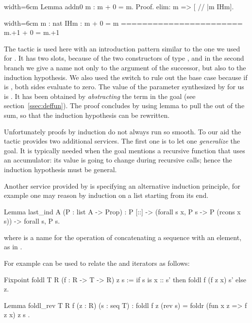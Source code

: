 \begin{coq}{}{width=6cm}
Lemma addn0 m : m + 0 = m.
Proof.
elim: m => [ // |m IHm].
\end{coq}
\begin{coqout}{}{width=6cm}
m : nat
IHm : m + 0 = m
=======================
m.+1 + 0 = m.+1
\end{coqout}
The  tactic is used here with an introduction pattern similar
to the one we used for . It has two slots, because of the
two constructors of type , and in the second branch we give a
name not only to the argument  of the successor, but also to the
induction hypothesis. We also used the \C{//} switch to rule out the
base case because if
 is , both sides evaluate to zero. The value of the parameter
 synthesized by  for us is
. It has been obtained by
\emph{abstracting} the term  in the goal (see
section~\ref{ssec:deffun}). The proof concludes by using lemma 
to  pull the  out of the sum, so that the induction hypothesis
 can be rewritten.

Unfortunately proofs by induction do not always run so smooth.
To our aid the  tactic provides two additional services.
The first one is to let one \emph{generalize}
the goal.  It is typically needed when the goal mentions a recursive function
that uses an accumulator: its value is going to change during recursive calls;
hence the induction hypothesis must be general.

Another service provided by  is specifying an alternative
induction principle, for example one may reason by induction on
a list starting from its end.

\begin{coq}{}{}
Lemma last_ind A (P : list A -> Prop) :
  P [::] -> (forall s x, P s -> P (rcons x s)) -> forall s, P s.
\end{coq}
where  is a name for the operation of concatenating
a sequence with an element, as in .

For example  can be used to relate the
 and  iterators as follows:

\begin{coq}{}{}
Fixpoint foldl T R (f : R -> T -> R) z s :=
  if s is x :: s' then foldl f (f z x) s' else z.

Lemma foldl_rev T R f (z : R) (s : seq T) :
  foldl f z (rev s) = foldr (fun x z => f z x) z s .
\end{coq}

